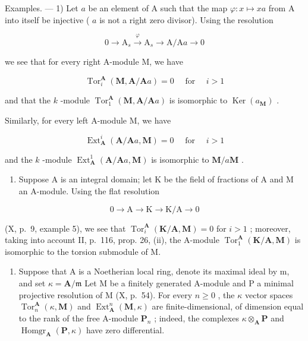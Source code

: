 Examples. --- 1) Let \(a\) be an element of A such that the map \(\varphi : x \mapsto xa\) from A into itself be injective ( \(a\) is not a right zero divisor). Using the resolution

\[
0 \rightarrow \mathrm{A} _ {s} \xrightarrow {\varphi} \mathrm{A} _ {s} \rightarrow \mathrm{A} / \mathrm{A} a \rightarrow 0
\]

we see that for every right A-module M, we have

\[
\operatorname{Tor} _ {i} ^ {\mathbf {A}} (\mathbf {M}, \mathbf {A} / \mathbf {A} a) = 0 \quad \text { for } \quad i > 1
\]

and that the \(k\) -module \(\operatorname{Tor}_1^{\mathbf{A}}(\mathbf{M}, \mathbf{A} / \mathbf{A}a)\) is isomorphic to \(\operatorname{Ker}(a_{\mathbf{M}})\) .

Similarly, for every left A-module M, we have

\[
\operatorname{Ext} _ {\mathbf {A}} ^ {i} (\mathbf {A} / \mathbf {A} a, \mathbf {M}) = 0 \quad \text { for } \quad i > 1
\]

and the \(k\) -module \(\operatorname{Ext}_{\mathbf{A}}^{1}(\mathbf{A}/\mathbf{A}a, \mathbf{M})\) is isomorphic to \(\mathbf{M}/a\mathbf{M}\) .

\begin{enumerate}
\def\labelenumi{\arabic{enumi})}
\setcounter{enumi}{1}
\tightlist
\item
  Suppose A is an integral domain; let K be the field of fractions of A and M an A-module. Using the flat resolution
\end{enumerate}

\[
0 \rightarrow \mathrm{A} \rightarrow \mathrm{K} \rightarrow \mathrm{K} / \mathrm{A} \rightarrow 0
\]

(X, p.~9, example 5), we see that \(\operatorname{Tor}_{i}^{\mathbf{A}}(\mathbf{K}/\mathbf{A}, \mathbf{M}) = 0\) for \(i > 1\) ; moreover, taking into account II, p.~116, prop. 26, (ii), the A-module \(\operatorname{Tor}_{1}^{\mathbf{A}}(\mathbf{K}/\mathbf{A}, \mathbf{M})\) is isomorphic to the torsion submodule of M.

\begin{enumerate}
\def\labelenumi{\arabic{enumi})}
\setcounter{enumi}{2}
\tightlist
\item
  Suppose that A is a Noetherian local ring, denote its maximal ideal by m, and set \(\kappa = \mathbf{A} / \mathfrak{m}\) Let M be a finitely generated A-module and P a minimal projective resolution of M (X, p.~54). For every \(n \geqslant 0\) , the \(\kappa\) vector spaces \(\operatorname{Tor}_n^{\mathbf{A}}(\kappa, \mathbf{M})\) and \(\operatorname{Ext}_{\mathbf{A}}^{n}(\mathbf{M}, \kappa)\) are finite-dimensional, of dimension equal to the rank of the free A-module \(\mathbf{P}_n\) ; indeed, the complexes \(\kappa \otimes_{\mathbf{A}} \mathbf{P}\) and \(\operatorname{Homgr}_{\mathbf{A}}(\mathbf{P}, \kappa)\) have zero differential.
\end{enumerate}

